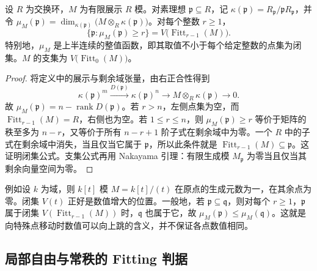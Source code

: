 \begin{proposition}\label{b3:prop:fitting-fiber-rank}
	设 \(R\) 为交换环，\(M\) 为有限展示 \(R\) 模。对素理想 \(\mathfrak p\subseteq R\)，记 \(\kappa(\mathfrak p)=R_{\mathfrak p}/\mathfrak pR_{\mathfrak p}\)，并令 \(\mu_M(\mathfrak p)=\dim_{\kappa(\mathfrak p)}\bigl(M\otimes_R\kappa(\mathfrak p)\bigr)\)。对每个整数 \(r\ge1\)，
	\[
		\bigl\{\mathfrak p:\mu_M(\mathfrak p)\ge r\bigr\} =V\bigl(\operatorname{Fitt}_{r-1}(M)\bigr).
	\]
	特别地，\(\mu_M\) 是上半连续的整值函数，即其取值不小于每个给定整数的点集为闭集。\(M\) 的支集为 \(V\bigl(\operatorname{Fitt}_0(M)\bigr)\)。
\end{proposition}
\begin{proof}
	将定义中的展示与剩余域张量，由右正合性得到
	\[
		\kappa(\mathfrak p)^m\xrightarrow{D(\mathfrak p)}\kappa(\mathfrak p)^n \longrightarrow M\otimes_R\kappa(\mathfrak p)\longrightarrow0.
	\]
	故 \(\mu_M(\mathfrak p)=n-\operatorname{rank}D(\mathfrak p)\)。若 \(r>n\)，左侧点集为空，而 \(\operatorname{Fitt}_{r-1}(M)=R\)，右侧也为空。若 \(1\le r\le n\)，则 \(\mu_M(\mathfrak p)\ge r\) 等价于矩阵的秩至多为 \(n-r\)，又等价于所有 \(n-r+1\) 阶子式在剩余域中为零。一个 \(R\) 中的子式在剩余域中消失，当且仅当它属于 \(\mathfrak p\)，所以此条件就是 \(\operatorname{Fitt}_{r-1}(M)\subseteq\mathfrak p\)。这证明闭集公式。支集公式再用 Nakayama 引理：有限生成模 \(M_{\mathfrak p}\) 为零当且仅当其剩余向量空间为零。
\end{proof}

例如设 \(k\) 为域，则 \(k[t]\) 模 \(M=k[t]/(t)\) 在原点的生成元数为一，在其余点为零。闭集 \(V(t)\) 正好是数值增大的位置。一般地，若 \(\mathfrak p\subseteq\mathfrak q\)，则对每个 \(r\ge1\)，\(\mathfrak p\) 属于闭集 \(V(\operatorname{Fitt}_{r-1}(M))\) 时，\(\mathfrak q\) 也属于它，故 \(\mu_M(\mathfrak p)\le\mu_M(\mathfrak q)\)。这就是向特殊点移动时数值可以向上跳的含义，并不保证各点数值相同。

\subsection{局部自由与常秩的 Fitting 判据}
\label{b3:subsec:1203:03}

